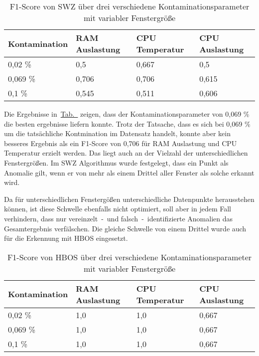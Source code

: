 \begin{table}[htbp]
    \centering
    \renewcommand{\arraystretch}{1.5}
    \begin{tabular}{l|lll}
    Kontamination & RAM Auslastung & CPU Temperatur & CPU Auslastung \\
    \hline
    0,02 \%       & 0,5            & 0,667          & 0,5            \\
    0,069 \%      & 0,706          & 0,706          & 0,615          \\
    0,1 \%        & 0,545          & 0,511          & 0,606         
    \end{tabular}
    \caption{\centering F1-Score von SWZ über drei verschiedene Kontaminationsparameter mit variabler Fenstergröße}
\label{tab:swz_tests}
\end{table}

Die Ergebnisse in~\hyperref[tab:swz_tests]{Tab.~} zeigen, dass der Kontaminationsparameter von 0,069 \% die besten
ergebnisse liefern konnte. Trotz der Tatsache, dass es sich bei 0,069 \% um die tatsächliche Kontmination im Datensatz handelt, konnte aber
kein besseres Ergebnis als ein F1-Score von 0,706 für RAM Auslastung und CPU Temperatur erzielt werden. Das liegt auch an der Vielzahl der
unterschiedlichen Fenstergrößen. Im SWZ Algorithmus wurde festgelegt, dass ein Punkt als Anomalie gilt, wenn er von mehr als einem Drittel
aller Fenster als solche erkannt wird.

Da für unterschiedlichen Fenstergößen unterschiedliche Datenpunkte herausstehen können, ist diese Schwelle ebenfalls nicht optimiert, soll
aber in jedem Fall verhindern, dass nur vereinzelt~-~und falsch~-~identifizierte Anomalien das Gesamtergebnis verfälschen. Die gleiche Schwelle
von einem Drittel wurde auch für die Erkennung mit HBOS eingesetzt.

\begin{table}[htbp]
    \centering
    \renewcommand{\arraystretch}{1.5}
    \begin{tabular}{l|lll}
    Kontamination   & RAM Auslastung    & CPU Temperatur    & CPU Auslastung \\
    \hline
    0,02 \%         & 1,0               & 1,0               & 0,667            \\
    0,069 \%        & 1,0               & 1,0               & 0,667          \\
    0,1 \%          & 1,0               & 1,0               & 0,667         
    \end{tabular}
    \caption{\centering F1-Score von HBOS über drei verschiedene Kontaminationsparameter mit variabler Fenstergröße}
\label{tab:hbos_tests}
\end{table}

